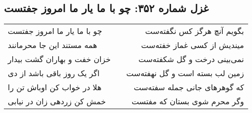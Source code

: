 \begin{center}
\section*{غزل شماره ۳۵۲: چو با ما یار ما امروز جفتست}
\label{sec:0352}
\begin{longtable}{l p{0.5cm} r}
چو با ما یار ما امروز جفتست
&&
بگویم آنچ هرگز کس نگفته‌ست
\\
همه مستند این جا محرمانند
&&
میندیش از کسی غماز خفته‌ست
\\
خزان خفت و بهاران گشت بیدار
&&
نمی‌بینی درخت و گل شکفته‌ست
\\
اگر یک روز باقی باشد از دی
&&
زمین لب بسته است و گل نهفته‌ست
\\
هلا در خواب کن اوباش تن را
&&
که گوهرهای جانی جمله سفته‌ست
\\
خمش کن زردهی زان در نیابی
&&
وگر محرم شوی بستان که مفتست
\\
\end{longtable}
\end{center}
